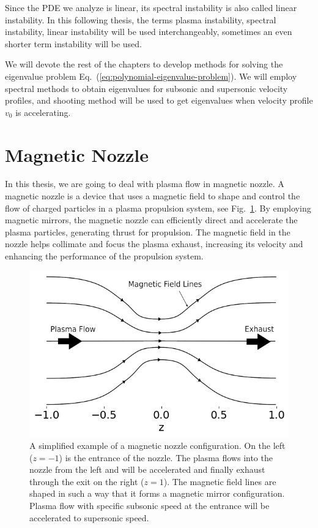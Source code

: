 Since the PDE we analyze is linear, its spectral instability is also called linear instability. In this following thesis, the terms plasma instability, spectral instability, linear instability will be used interchangeably, sometimes an even shorter term instability will be used.

We will devote the rest of the chapters to develop methods for solving the eigenvalue problem Eq.~(\ref{eq:polynomial-eigenvalue-problem}). We will employ spectral methods to obtain eigenvalues for subsonic and supersonic velocity profiles, and shooting method will be used to get eigenvalues when velocity profile $v_0$ is accelerating.

\section{Magnetic Nozzle}
In this thesis, we are going to deal with plasma flow in magnetic nozzle.
A magnetic nozzle is a device that uses a magnetic field to shape and control the flow of charged particles in a plasma propulsion system, see Fig.~\ref{fig:magnetic-nozzle}. By employing magnetic mirrors, the magnetic nozzle can efficiently direct and accelerate the plasma particles, generating thrust for propulsion. The magnetic field in the nozzle helps collimate and focus the plasma exhaust, increasing its velocity and enhancing the performance of the propulsion system.

\begin{figure}[htbp]
	\centering
	\includegraphics[width=0.7\linewidth]{figures/magnetic-nozzle.png}
	\caption{A simplified example of a magnetic nozzle configuration. On the left ($z=-1$) is the entrance of the nozzle. The plasma flows into the nozzle from the left and will be accelerated and finally exhaust through the exit on the right ($z=1$). The magnetic field lines are shaped in such a way that it forms a magnetic mirror configuration. Plasma flow with specific subsonic speed at the entrance will be accelerated to supersonic speed.}
	\label{fig:magnetic-nozzle}
\end{figure}

